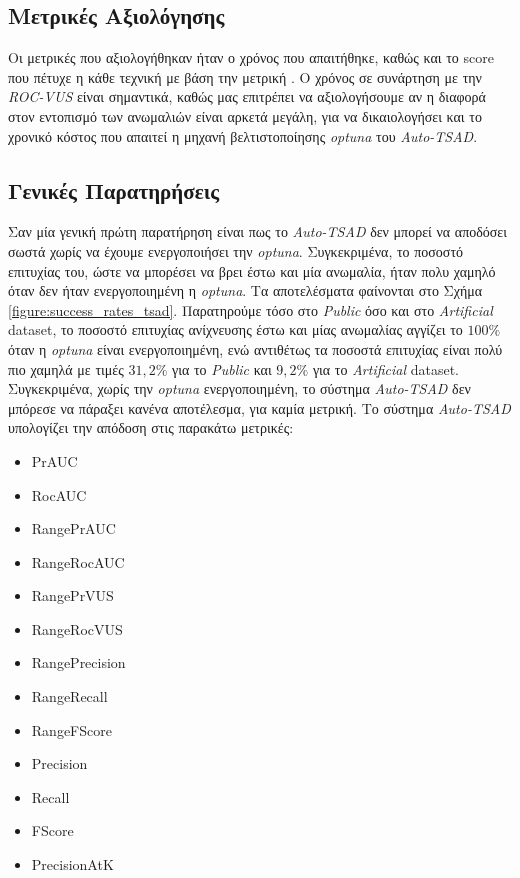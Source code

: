 \subsection{Μετρικές Αξιολόγησης}
Οι μετρικές που αξιολογήθηκαν ήταν ο χρόνος που απαιτήθηκε, καθώς και το score που πέτυχε η κάθε τεχνική με βάση την μετρική . O χρόνος σε συνάρτηση με την \emph{ROC-VUS} είναι σημαντικά, καθώς μας επιτρέπει να αξιολογήσουμε αν η διαφορά στον εντοπισμό των ανωμαλιών είναι αρκετά μεγάλη, για να δικαιολογήσει και το χρονικό κόστος που απαιτεί η μηχανή βελτιστοποίησης \emph{optuna} του \emph{Auto-TSAD}.

\subsection{Γενικές Παρατηρήσεις}
Σαν μία γενική πρώτη παρατήρηση είναι πως το \emph{Auto-TSAD} δεν μπορεί να αποδόσει σωστά χωρίς να έχουμε ενεργοποιήσει την \emph{optuna}. Συγκεκριμένα, το ποσοστό επιτυχίας του, ώστε να μπορέσει να βρει έστω και μία ανωμαλία, ήταν πολυ χαμηλό όταν δεν ήταν ενεργοποιημένη η \emph{optuna}. Τα αποτελέσματα φαίνονται στο Σχήμα \ref{figure:success_rates_tsad}. Παρατηρούμε τόσο στο \emph{Public} όσο και στο \emph{Artificial} dataset, το ποσοστό επιτυχίας ανίχνευσης έστω και μίας ανωμαλίας αγγίζει το $100\%$ όταν η \emph{optuna} είναι ενεργοποιημένη, ενώ αντιθέτως τα ποσοστά επιτυχίας είναι πολύ πιο χαμηλά με τιμές $31,2\%$ για το \emph{Public} και $9,2\%$ για το \emph{Artificial} dataset.
Συγκεκριμένα, χωρίς την \emph{optuna} ενεργοποιημένη, το σύστημα \emph{Auto-TSAD} δεν μπόρεσε να πάραξει κανένα αποτέλεσμα, για καμία μετρική. Το σύστημα \emph{Auto-TSAD} υπολογίζει την απόδοση στις παρακάτω μετρικές:

\begin{itemize}
    \item PrAUC
    \item RocAUC
    \item RangePrAUC
    \item RangeRocAUC
    \item RangePrVUS
    \item RangeRocVUS
    \item RangePrecision
    \item RangeRecall
    \item RangeFScore
    \item Precision
    \item Recall
    \item FScore
    \item PrecisionAtK
\end{itemize}

